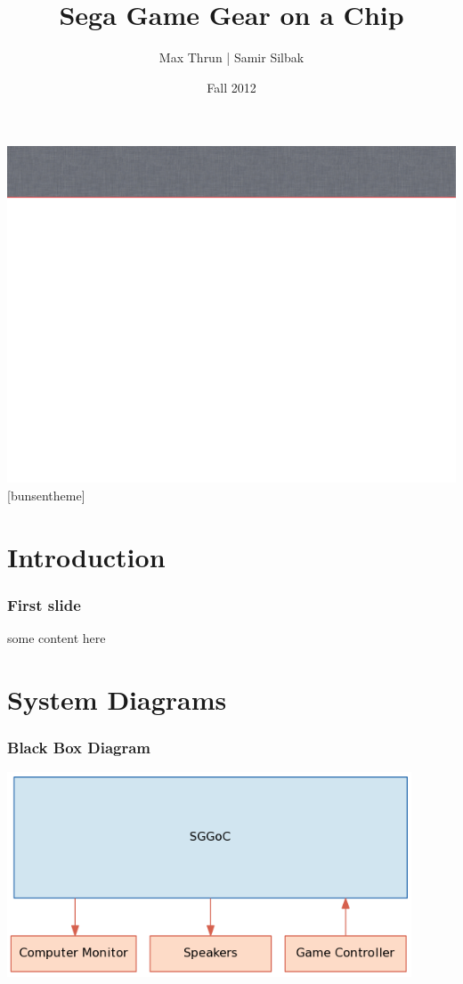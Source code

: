 \documentclass{beamer}
\title{Sega Game Gear on a Chip}
\author{Max Thrun | Samir Silbak}
\institute{University of Cincinnati}
\date{Fall 2012}
\begin{document}
\maketitle

%
%
{\includegraphics[width=\paperwidth,height=\paperheight]{slide_bg}}
[bunsentheme]

\section{Introduction}
\begin{frame}
\frametitle{First slide}
some content here
\end{frame}

\section{System Diagrams}
\begin{frame}
    \frametitle{Black Box Diagram}
    \begin{center}
        \includegraphics[width=0.9\textwidth]{../block_diagrams/block_diagram_external.png}
    \end{center}
\end{frame}
\end{document}
